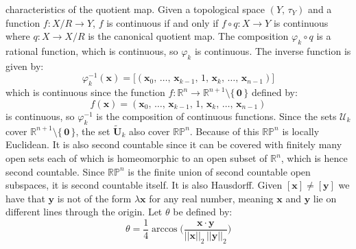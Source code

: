 \documentclass{article}
\theoremstyle{plain}
\theoremstyle{normal}
\newenvironment{example}{%
    \pushQED{\qed}\renewcommand{\qedsymbol}{$\blacksquare$}\examplex%
}{%
    \popQED\endexamplex%
}
\begin{document}
\begin{example}[\textbf{Real Projective Space}]
            characteristics of the quotient map. Given a topological space
            $(Y,\,\tau_{Y})$ and a function $f:X/R\rightarrow{Y}$, $f$ is
            continuous if and only if $f\circ{q}:X\rightarrow{Y}$ is
            continuous where $q:X\rightarrow{X}/R$ is the canonical quotient
            map. The composition $\varphi_{k}\circ{q}$ is a rational function,
            which is continuous, so $\varphi_{k}$ is continuous. The inverse
            function is given by:
            \begin{equation}
                \varphi_{k}^{-1}(\mathbf{x})
                =\big[
                    (\mathbf{x}_{0},\,\dots,\,\mathbf{x}_{k-1},\,1,\,
                    \mathbf{x}_{k},\,\dots,\,\mathbf{x}_{n-1})
                \big]
            \end{equation}
            which is continuous since the function
            $f:\mathbb{R}^{n}\rightarrow\mathbb{R}^{n+1}\setminus\{\,\mathbf{0}\,\}$
            defined by:
            \begin{equation}
                f(\mathbf{x})=
                (\mathbf{x}_{0},\,\dots,\,\mathbf{x}_{k-1},\,1,\,
                    \mathbf{x}_{k},\,\dots,\,\mathbf{x}_{n-1})
            \end{equation}
            is continuous, so $\varphi_{k}^{-1}$ is the composition of
            continuous functions. Since the sets
            $\mathcal{U}_{k}$ cover
            $\mathbb{R}^{n+1}\setminus\{\,\mathbf{0}\,\}$, the set
            $\tilde{\mathbf{U}}_{k}$ also cover $\mathbb{RP}^{n}$. Because of
            this $\mathbb{RP}^{n}$ is locally Euclidean. It is also second
            countable since it can be covered with finitely many open sets
            each of which is homeomorphic to an open subset of $\mathbb{R}^{n}$,
            which is hence second countable. Since $\mathbb{RP}^{n}$ is the
            finite union of second countable open subspaces, it is second
            countable itself. It is also Hausdorff. Given
            $[\mathbf{x}]\ne[\mathbf{y}]$ we have that $\mathbf{y}$ is not
            of the form $\lambda\mathbf{x}$ for any real number, meaning
            $\mathbf{x}$ and $\mathbf{y}$ lie on different lines through the
            origin. Let $\theta$ be defined by:
            \begin{equation}
                \theta=
                \frac{1}{4}\arccos\Big(
                    \frac{\mathbf{x}\cdot\mathbf{y}}
                        {||\mathbf{x}||_{2}\,||\mathbf{y}||_{2}}
                \Big)
            \end{equation}

\end{example}
\end{document}
